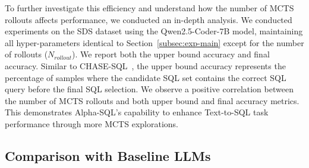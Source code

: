 To further investigate this efficiency and understand how the number of MCTS rollouts affects performance, we conducted an in-depth analysis.
We conducted experiments on the SDS dataset using the Qwen2.5-Coder-7B model, maintaining all hyper-parameters identical to Section~\ref{subsec:exp-main} except for the number of rollouts ($N_{rollout}$). 
We report both the upper bound accuracy and final accuracy. Similar to CHASE-SQL~\cite{CHASE}, the upper bound accuracy represents the percentage of samples where the candidate SQL set contains the correct SQL query before the final SQL selection.
We observe a positive correlation between the number of MCTS rollouts and both upper bound and final accuracy metrics. This demonstrates Alpha-SQL's capability to enhance Text-to-SQL task performance through more MCTS explorations.

\subsection{Comparison with Baseline LLMs}
\label{subsec:exp-baseline-llm}

